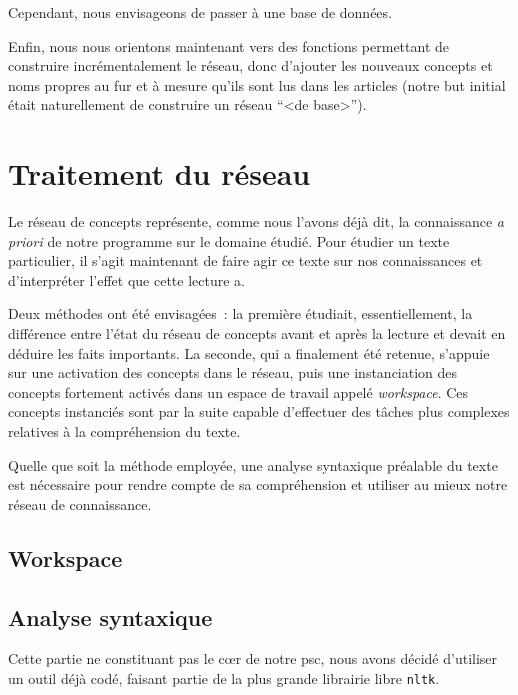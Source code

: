\documentclass[a4paper, 12pt]{article}
\newcommand{\pyt}[1]{\texttt{#1}}%
\begin{document}
Cependant, nous envisageons de passer à une base de données.

Enfin, nous nous orientons maintenant vers des fonctions permettant de construire incrémentalement le réseau, donc d'ajouter les nouveaux concepts et noms propres au fur et à mesure qu'ils sont lus dans les articles (notre but initial était naturellement de construire un réseau ``<de base>'').

\section{Traitement du réseau}

Le réseau de concepts représente, comme nous l'avons déjà dit, la connaissance \textit{a priori} de notre programme sur le domaine étudié. Pour étudier un texte particulier, il s'agit maintenant de faire agir ce texte sur nos connaissances et d'interpréter l'effet que cette lecture a.

Deux méthodes ont été envisagées~: la première étudiait, essentiellement, la différence entre l'état du réseau de concepts avant et après la lecture et devait en déduire les faits importants. La seconde, qui a finalement été retenue, s'appuie sur une activation des concepts dans le réseau, puis une instanciation des concepts fortement activés dans un espace de travail appelé \textit{workspace}. Ces concepts instanciés sont par la suite capable d'effectuer des tâches plus complexes relatives à la compréhension du texte.

Quelle que soit la méthode employée, une analyse syntaxique préalable du texte est nécessaire pour rendre compte de sa compréhension et utiliser au mieux notre réseau de connaissance.

\subsection{Workspace}



\subsection{Analyse syntaxique}

Cette partie ne constituant pas le c\oe{}r de notre psc, nous avons décidé d'utiliser un outil déjà codé, faisant partie de la plus grande librairie libre \pyt{nltk}.
\end{document}
